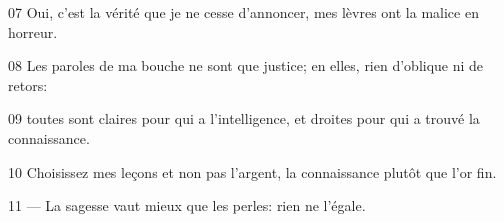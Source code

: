 
07 Oui, c’est la vérité que je ne cesse d’annoncer, mes lèvres ont la malice en horreur.

08 Les paroles de ma bouche ne sont que justice; en elles, rien d’oblique ni de retors:

09 toutes sont claires pour qui a l’intelligence, et droites pour qui a trouvé la connaissance.

10 Choisissez mes leçons et non pas l’argent, la connaissance plutôt que l’or fin.

11 --- La sagesse vaut mieux que les perles: rien ne l’égale.
